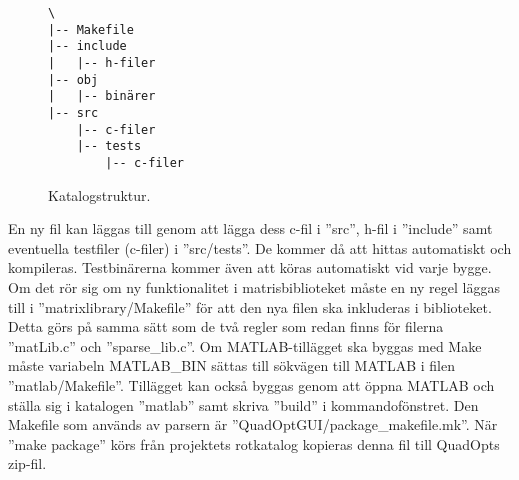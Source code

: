 \begin{figure}[H]
  \centering
  \begin{verbatim}
\
|-- Makefile
|-- include
|   |-- h-filer
|-- obj
|   |-- binärer
|-- src
    |-- c-filer
    |-- tests
        |-- c-filer
  \end{verbatim}
  \caption{Katalogstruktur.}
  \label{fig:katalogstruktur}
\end{figure}

\noindent En ny fil kan läggas till genom att lägga dess c-fil i ''src'', h-fil i ''include'' samt eventuella testfiler (c-filer) i ''src/tests''. De kommer då att hittas automatiskt och kompileras. Testbinärerna kommer även att köras automatiskt vid varje bygge. Om det rör sig om ny funktionalitet i matrisbiblioteket måste en ny regel läggas till i ''matrixlibrary/Makefile'' för att den nya filen ska inkluderas i biblioteket. Detta görs på samma sätt som de två regler som redan finns för filerna ''matLib.c'' och ''sparse\_lib.c''.
\newline
\newline
Om MATLAB-tillägget ska byggas med Make måste variabeln MATLAB\_BIN sättas till sökvägen till MATLAB i filen ''matlab/Makefile''. Tillägget kan också byggas genom att öppna MATLAB och ställa sig i katalogen ''matlab'' samt skriva ''build'' i kommandofönstret.
\newline
\newline
Den Makefile som används av parsern är ''QuadOptGUI/package\_makefile.mk''. När ''make package'' körs från projektets rotkatalog kopieras denna fil till QuadOpts zip-fil.

